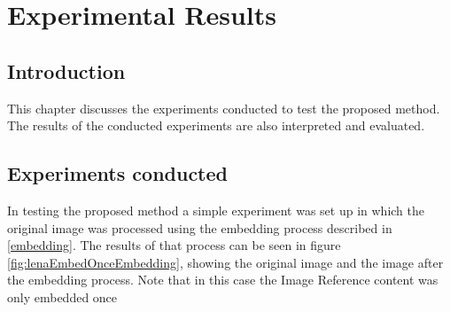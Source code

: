 \documentclass[12pt]{article}
\begin{document}
\section{Experimental Results} 
\subsection{Introduction}
This chapter discusses the experiments conducted to test the proposed method. 
The results of the conducted experiments are also interpreted and evaluated. 

\subsection{Experiments conducted}
\label{experimentsConducted}
In testing the proposed method a simple experiment was set up in which the original image was processed using the embedding process described in \ref{embedding}.
The results of that process can be seen in figure \ref{fig:lenaEmbedOnceEmbedding}, showing the original image and the image after the embedding process.
Note that in this case the Image Reference content was only embedded once
\end{document}
